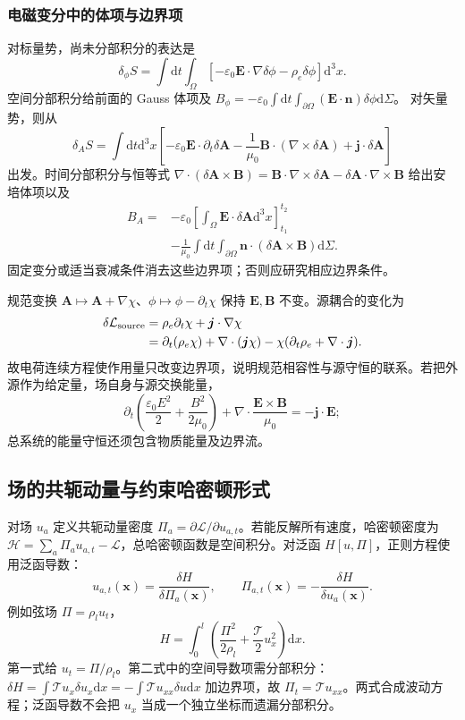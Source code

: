 \documentclass[UTF8,zihao=-4,fontset=fandol,a4paper]{ctexart}
\newcommand{\vect}[1]{\bm{#1}}\newcommand{\dd}{\mathrm d}\newcommand{\pd}{\partial}
\begin{document}
\subsubsection*{电磁变分中的体项与边界项}
对标量势，尚未分部积分的表达是
\[
\delta_\phi S=\int\dd t\int_\Omega
[-\varepsilon_0\vect E\cdot\nabla\delta\phi-\rho_e\delta\phi]\dd^3x.
\]
空间分部积分给前面的 Gauss 体项及
$B_\phi=-\varepsilon_0\int\dd t\int_{\partial\Omega}
(\vect E\cdot\vect n)\delta\phi\dd\Sigma$。
对矢量势，则从
\[
\delta_A S=\int\dd t\dd^3x
\left[-\varepsilon_0\vect E\cdot\partial_t\delta\vect A
-\frac1{\mu_0}\vect B\cdot(\nabla\times\delta\vect A)
+\vect j\cdot\delta\vect A\right]
\]
出发。时间分部积分与恒等式
$\nabla\cdot(\delta\vect A\times\vect B)
=\vect B\cdot\nabla\times\delta\vect A
-\delta\vect A\cdot\nabla\times\vect B$
给出安培体项以及
\begin{align*}
B_A={}&-\varepsilon_0\left[\int_\Omega\vect E\cdot\delta\vect A\dd^3x\right]_{t_1}^{t_2}\\
&-\frac1{\mu_0}\int\dd t\int_{\partial\Omega}
\vect n\cdot(\delta\vect A\times\vect B)\dd\Sigma.
\end{align*}
固定变分或适当衰减条件消去这些边界项；否则应研究相应边界条件。

规范变换 $\vect A\mapsto\vect A+\nabla\chi$、$\phi\mapsto\phi-\partial_t\chi$ 保持 $\vect E,\vect B$ 不变。源耦合的变化为
\begin{align*}
\delta\mathcal L_{\rm source}
&=\rho_e\partial_t\chi+\vect j\cdot\nabla\chi\\
&=\partial_t(\rho_e\chi)+\nabla\cdot(\vect j\chi)
-\chi(\partial_t\rho_e+\nabla\cdot\vect j).
\end{align*}
故电荷连续方程使作用量只改变边界项，说明规范相容性与源守恒的联系。若把外源作为给定量，场自身与源交换能量，
\[
\partial_t\left(\frac{\varepsilon_0E^2}{2}+\frac{B^2}{2\mu_0}\right)
+\nabla\cdot\frac{\vect E\times\vect B}{\mu_0}
=-\vect j\cdot\vect E;
\]
总系统的能量守恒还须包含物质能量及边界流。
\subsection{场的共轭动量与约束哈密顿形式}
对场 $u_a$ 定义共轭动量密度 $\Pi_a=\partial\mathcal L/\partial u_{a,t}$。若能反解所有速度，哈密顿密度为 $\mathcal H=\sum_a\Pi_au_{a,t}-\mathcal L$，总哈密顿函数是空间积分。对泛函 $H[u,\Pi]$，正则方程使用泛函导数：
\[
u_{a,t}(\vect x)=\frac{\delta H}{\delta\Pi_a(\vect x)},\qquad
\Pi_{a,t}(\vect x)=-\frac{\delta H}{\delta u_a(\vect x)}.
\]
例如弦场 $\Pi=\rho_lu_t$，
\[
H=\int_0^l\left(\frac{\Pi^2}{2\rho_l}+\frac{\mathcal T}{2}u_x^2\right)\dd x.
\]
第一式给 $u_t=\Pi/\rho_l$。第二式中的空间导数项需分部积分：$\delta H=\int\mathcal T u_x\delta u_x\dd x=-\int\mathcal T u_{xx}\delta u\dd x$ 加边界项，故 $\Pi_t=\mathcal T u_{xx}$。两式合成波动方程；泛函导数不会把 $u_x$ 当成一个独立坐标而遗漏分部积分。
\end{document}
